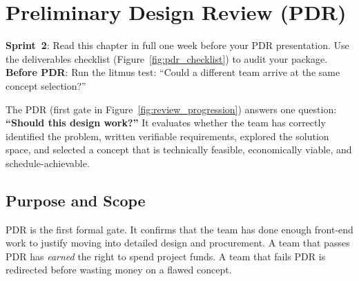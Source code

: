 \chapter{Preliminary Design Review (PDR)}\label{ch:pdr}

\begin{tipbox}
\textbf{Sprint~2}: Read this chapter in full one week before your PDR presentation. Use the deliverables checklist (Figure~\ref{fig:pdr_checklist}) to audit your package. \textbf{Before PDR}: Run the litmus test: ``Could a different team arrive at the same concept selection?''
\end{tipbox}


\vspace{1em}

The PDR (first gate in Figure~\ref{fig:review_progression}) answers one question: \textbf{``Should this design work?''} It evaluates whether the team has correctly identified the problem, written verifiable requirements, explored the solution space, and selected a concept that is technically feasible, economically viable, and schedule-achievable.

\vspace{1em}

\section{Purpose and Scope}
PDR is the first formal gate. It confirms that the team has done enough front-end work to justify moving into detailed design and procurement. A team that passes PDR has \emph{earned} the right to spend project funds. A team that fails PDR is redirected before wasting money on a flawed concept.

